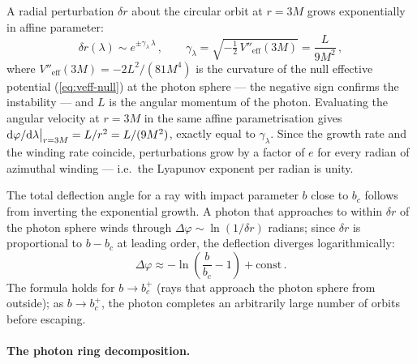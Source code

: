 A radial perturbation $\delta r$ about the circular orbit at $r = 3M$
grows exponentially in affine parameter:
%
\begin{equation}
  \delta r(\lambda) \sim e^{\pm\gamma_\lambda\,\lambda} \,, \qquad
  \gamma_\lambda = \sqrt{-\tfrac{1}{2}\,V''_{\text{eff}}(3M)}
    = \frac{L}{9M^2} \,,
  \label{eq:photon-lyapunov}
\end{equation}
%
where $V''_{\text{eff}}(3M) = -2L^2/(81M^4)$ is the curvature of the
null effective potential (\cref{eq:veff-null}) at the photon sphere ---
the negative sign confirms the instability --- and $L$ is the angular
momentum of the photon.  Evaluating the angular velocity at $r = 3M$ in
the same affine parametrisation gives
$\mathrm{d}\varphi/\mathrm{d}\lambda\big|_{r=3M} = L/r^2 = L/(9M^2)$, exactly equal to
$\gamma_\lambda$.  Since the growth rate and the winding rate coincide,
perturbations grow by a factor of $e$ for every radian of azimuthal
winding --- i.e.\ the Lyapunov exponent per radian is unity.

The total deflection angle for a ray with impact parameter $b$ close to
$b_c$ follows from inverting the exponential growth.  A photon that
approaches to within $\delta r$ of the photon sphere winds through
$\Delta\varphi \sim \ln(1/\delta r)$ radians; since $\delta r$ is
proportional to $b - b_c$ at leading order, the deflection diverges
logarithmically:
%
\begin{equation}
  \Delta\varphi \approx
    -\ln\!\left(\frac{b}{b_c} - 1\right) + \text{const} \,.
  \label{eq:deflection-divergence}
\end{equation}
%
The formula holds for $b \to b_c^+$ (rays that approach the photon
sphere from outside); as $b \to b_c^+$, the photon completes an
arbitrarily large number of orbits before escaping.

\paragraph{The photon ring decomposition.}

